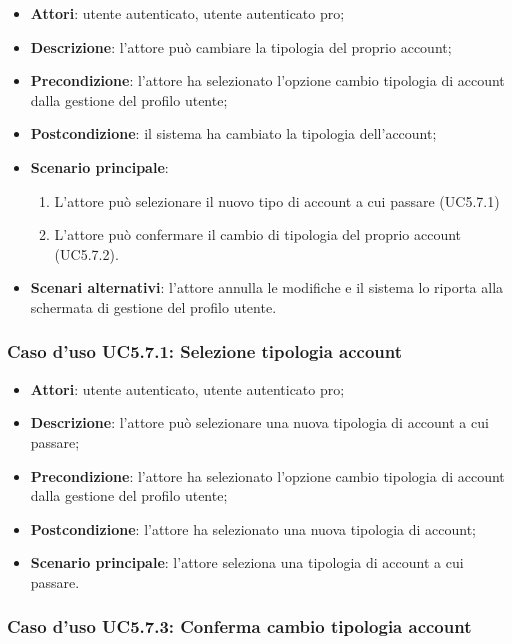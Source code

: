 \begin{itemize}
	\item \textbf{Attori}: utente autenticato, utente autenticato pro;
	\item \textbf{Descrizione}: l'attore può cambiare la tipologia del proprio account; 
	\item \textbf{Precondizione}:  l'attore ha selezionato l'opzione cambio tipologia di account dalla gestione del profilo utente;
	\item \textbf{Postcondizione}: il sistema ha cambiato la tipologia dell'account;
	\item \textbf{Scenario principale}:
	\begin{enumerate}
		\item L'attore può selezionare il nuovo tipo di account a cui passare (UC5.7.1)
		\item L'attore può confermare il cambio di tipologia del proprio account (UC5.7.2).
	\end{enumerate}
	\item \textbf{Scenari alternativi}: l'attore annulla le modifiche e il sistema lo riporta alla schermata di gestione del profilo utente.
\end{itemize}

\subsubsection{Caso d'uso UC5.7.1: Selezione tipologia account}

\begin{itemize}
	\item \textbf{Attori}: utente autenticato, utente autenticato pro;
	\item \textbf{Descrizione}: l'attore può selezionare una nuova tipologia di account a cui passare;
	\item \textbf{Precondizione}: l'attore ha selezionato l'opzione cambio tipologia di account dalla gestione del profilo utente;
	\item \textbf{Postcondizione}: l'attore ha selezionato  una nuova tipologia di account;
	\item \textbf{Scenario principale}: l'attore seleziona una tipologia di account a cui passare.
\end{itemize}

\subsubsection{Caso d'uso UC5.7.3: Conferma cambio tipologia account}

